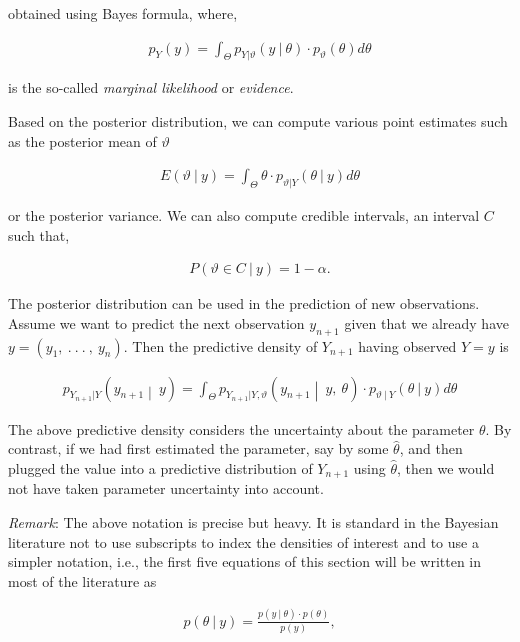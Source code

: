 \documentclass[11pt,a4paper]{article}
\begin{document}
obtained using Bayes formula, where,

\begin{align}p_{Y}(y) = \int_{\Theta}^{}{p_{Y|\vartheta}(y\ |\ \theta) \cdot p_{\vartheta}(\theta)}d\theta\end{align}

is the so-called \emph{marginal likelihood} or \emph{evidence}.

Based on the posterior distribution, we can compute various point
estimates such as the posterior mean of \(\vartheta\)

\begin{align}E(\vartheta\ |\ y) = \int_{\Theta}^{}{\theta \cdot p_{\vartheta|Y}(\theta\ |\ y)}d\theta\end{align}

or the posterior variance. We can also compute credible intervals, an
interval \(C\) such that,

\begin{align}P(\vartheta \in C\ |\ y) = 1 - \alpha.\end{align}

The posterior distribution can be used in the prediction of new
observations. Assume we want to predict the next observation
\(y_{n + 1}\) given that we already have
\(y = (y_{1},\ .\ .\ .\ ,\ y_{n})\). Then the predictive density of
\(Y_{n + 1}\) having observed \(Y = y\) is

\begin{align}p_{Y_{n + 1}|Y}\left( y_{n + 1} \middle| \ y \right) = \int_{\Theta}^{}{p_{Y_{n + 1}|Y,\vartheta}\left( y_{n + 1} \middle| \ y,\ \theta \right) \cdot p_{\vartheta\ |\ Y}(\theta\ |\ y)}d\theta\end{align}

The above predictive density considers the uncertainty about the
parameter \(\theta\). By contrast, if we had ﬁrst estimated the
parameter, say by some \(\widehat{\theta}\), and then plugged the value
into a predictive distribution of \(Y_{n + 1}\) using
\(\widehat{\theta}\), then we would not have taken parameter uncertainty
into account.

\emph{Remark}: The above notation is precise but heavy. It is standard
in the Bayesian literature not to use subscripts to index the densities
of interest and to use a simpler notation, i.e., the first five
equations of this section will be written in most of the literature as

\begin{align}p(\theta\ |\ y) = \frac{p(y\ |\ \theta) \cdot p(\theta)}{p(y)},\end{align}
\end{document}
